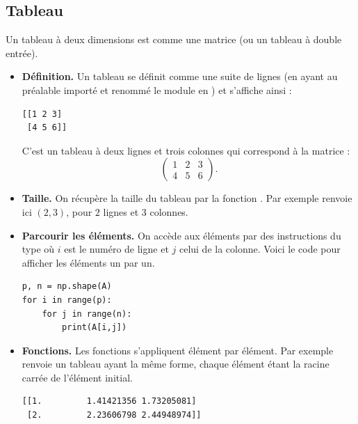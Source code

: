 \documentclass[11pt,class=report,crop=false]{standalone}
\begin{document}
\subsection{Tableau}

Un tableau à deux dimensions est comme une matrice (ou un tableau à double entrée).

\begin{itemize}
  \item \textbf{Définition.} Un tableau se définit comme une suite de lignes
(en ayant au préalable importé et renommé le module \numpy{} en ) et s'affiche ainsi :
  \begin{center}
  \begin{minipage}{0.15\textwidth}
\begin{lstlisting}
[[1 2 3]
 [4 5 6]]
\end{lstlisting}
  \end{minipage}
  \end{center}
  
 C'est un tableau à deux lignes et trois colonnes qui correspond à la matrice :
 $$\begin{pmatrix}1&2&3\\4&5&6\end{pmatrix}.$$

  \item \textbf{Taille.}  On récupère la taille du tableau par la fonction .  Par exemple  renvoie ici $(2,3)$, pour $2$ lignes et $3$ colonnes.
  
  \item \textbf{Parcourir les éléments.} On accède aux éléments par des instructions du type  où $i$ est le numéro de ligne et $j$ celui de la colonne. Voici le code pour afficher les éléments un par un.
  
  \begin{minipage}{0.59\textwidth}
  \end{minipage}
  \begin{minipage}{0.4\textwidth}
\begin{lstlisting}
p, n = np.shape(A)
for i in range(p):
	for j in range(n):
		print(A[i,j])
\end{lstlisting}
  \end{minipage}
  
  \item \textbf{Fonctions.} Les fonctions s'appliquent élément par élément. Par exemple  renvoie un tableau ayant la même forme, chaque élément étant la racine carrée de l'élément initial.
  \begin{center}
  \begin{minipage}{0.4\textwidth}
\begin{lstlisting}
[[1.         1.41421356 1.73205081]
 [2.         2.23606798 2.44948974]]
\end{lstlisting}
  \end{minipage}
  \end{center}  
  

\end{itemize}
\end{document}
